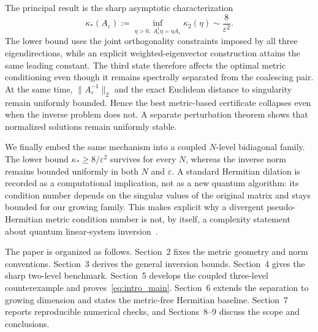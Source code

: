 The principal result is the sharp asymptotic characterization
\begin{equation}\label{eq:intro_main}
 \kappa_*(A_\varepsilon)
 :=\inf_{\eta>0,\;A_\varepsilon^\dagger\eta=\eta A_\varepsilon}
 \kappa_2(\eta)
 \sim \frac{8}{\varepsilon^2}.
\end{equation}
The lower bound uses the joint orthogonality constraints imposed by all three eigendirections,
while an explicit weighted-eigenvector construction attains the same leading constant.  The
third state therefore affects the optimal metric conditioning even though it remains spectrally
separated from the coalescing pair.  At the same time, $\|A_\varepsilon^{-1}\|_2$ and the exact
Euclidean distance to singularity remain uniformly bounded.  Hence the best metric-based
certificate collapses even when the inverse problem does not.  A separate perturbation theorem
shows that normalized solutions remain uniformly stable.

We finally embed the same mechanism into a coupled $N$-level bidiagonal family.  The lower
bound $\kappa_*\ge 8/\varepsilon^2$ survives for every $N$, whereas the inverse norm remains
bounded uniformly in both $N$ and $\varepsilon$.  A standard Hermitian dilation is recorded as
a computational implication, not as a new quantum algorithm: its condition number depends on
the singular values of the original matrix and stays bounded for our growing family.  This
makes explicit why a divergent pseudo-Hermitian metric condition number is not, by itself, a
complexity statement about quantum linear-system inversion~\cite{Gilyen2019,Berry2026}.

The paper is organized as follows.  Section~2 fixes the metric geometry and norm conventions.
Section~3 derives the general inversion bounds.  Section~4 gives the sharp two-level benchmark.
Section~5 develops the coupled three-level counterexample and proves~\eqref{eq:intro_main}.
Section~6 extends the separation to growing dimension and states the metric-free Hermitian
baseline.  Section~7 reports reproducible numerical checks, and Sections~8--9 discuss the
scope and conclusions.
